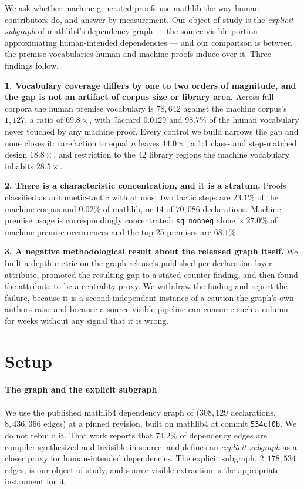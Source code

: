 \documentclass{article}
\begin{document}
We ask whether machine-generated proofs use mathlib the way human contributors
do, and answer by measurement. Our object of study is the \emph{explicit
subgraph} of mathlib4's dependency graph \citep{li2026network} --- the
source-visible portion approximating human-intended dependencies --- and our
comparison is between the premise vocabularies human and machine proofs induce
over it. Three findings follow.

\textbf{1. Vocabulary coverage differs by one to two orders of magnitude, and
the gap is not an artifact of corpus size or library area.} Across full corpora
the human premise vocabulary is $78{,}642$ against the machine corpus's
$1{,}127$, a ratio of $69.8\times$, with Jaccard $0.0129$ and $98.7\%$ of the
human vocabulary never touched by any machine proof. Every control we build narrows the gap and
none closes it: rarefaction to equal $n$ leaves $44.0\times$, a 1:1 class- and
step-matched design $18.8\times$, and restriction to the $42$ library regions the
machine vocabulary inhabits $28.5\times$.

\textbf{2. There is a characteristic concentration, and it is a stratum.}
Proofs classified as arithmetic-tactic with at most two tactic steps are
$23.1\%$ of the machine corpus and $0.02\%$ of mathlib, or $14$ of $70{,}086$
declarations. Machine premise usage is correspondingly concentrated:
\texttt{sq\_nonneg} alone is $27.0\%$ of machine premise occurrences and the top
25 premises are $68.1\%$.

\textbf{3. A negative methodological result about the released graph itself.}
We built a depth metric on the graph release's published per-declaration layer
attribute, promoted the resulting gap to a stated counter-finding, and then
found the attribute to be a centrality proxy. We withdraw the finding and report the failure, because it is a
second independent instance of a caution the graph's own authors raise
\citep{li2026network} and because a source-visible pipeline can consume such a
column for weeks without any signal that it is wrong.

\section{Setup}

\paragraph{The graph and the explicit subgraph}
We use the published mathlib4 dependency graph of \citet{li2026network}
($308{,}129$ declarations, $8{,}436{,}366$ edges) at a pinned revision, built on
mathlib4 at commit \texttt{534cf0b}. We do not rebuild it. That work reports
that $74.2\%$ of dependency edges are compiler-synthesized and invisible in
source, and defines an \emph{explicit subgraph} as a closer proxy for
human-intended dependencies. The explicit subgraph, $2{,}178{,}534$ edges, is
our object of study, and source-visible extraction is the appropriate instrument
for it.
\end{document}
